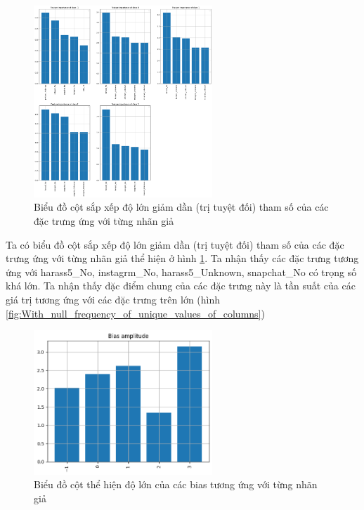 \begin{enumerate}[label=(\alph*)]
    \begin{figure}[H]
        \centering
        \includegraphics[width=0.6\textwidth]{figures/Thanh/Data_Analysis/With_null_Feature_Importance_Logistic_PCA_features.png}
        \caption{Biểu đồ cột sắp xếp độ lớn giảm dần (trị tuyệt đối) tham số của các đặc trưng ứng với từng nhãn giả}
        \label{fig:With_null_Feature_Importance_Logistic_PCA_features}
    \end{figure}

    Ta có biểu đồ cột sắp xếp độ lớn giảm dần (trị tuyệt đối) tham số của các đặc trưng ứng với từng nhãn giả thể hiện ở hình \ref{fig:With_null_Feature_Importance_Logistic_PCA_features}.
    Ta nhận thấy các đặc trưng tương ứng với harass5\_No, instagrm\_No, harass5\_Unknown, snapchat\_No có trọng số khá lớn.
    Ta nhận thấy đặc điểm chung của các đặc trưng này là tần suất của các giá trị tương ứng với các đặc trưng trên lớn (hình \ref{fig:With_null_frequency_of_unique_values_of_columns})

    \begin{figure}[H]
        \centering
        \includegraphics[width=0.6\textwidth]{figures/Thanh/Data_Analysis/With_null_Bias_Importance_Logistic_PCA_features.png}
        \caption{Biểu đồ cột thể hiện độ lớn của các bias tương ứng với từng nhãn giả}
        \label{fig:With_null_Bias_Importance_Logistic_PCA_features}
    \end{figure}


\end{enumerate}
